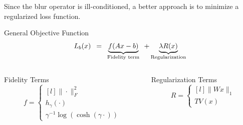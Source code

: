 \documentclass[12pt]{beamer}
\begin{document}
\begin{frame}
Since the blur operator is ill-conditioned, a better approach is to minimize a regularized loss function.
\begin{block}{General Objective Function}
\[ L_b(x) \hspace{0.5em} = \hspace{0.5em} \underbrace{f(Ax-b)}_{\text{Fidelity term}} \hspace{0.5em} + \underbrace{\lambda R(x)}_{\text{Regularization}} \]
\end{block}

\begin{columns}[T]
	\begin{column}{0.45\linewidth}
		\begin{block}{Fidelity Terms} \vspace{-2.5ex}
			\[ f = \left\{ \begin{matrix*}[l] 
			\| \cdot \|_F^2 \\[1ex] h_{\gamma}( \cdot ) \\[1ex] \gamma^{-1} \log(\cosh(\gamma \cdot)) 
			\end{matrix*} \right. \]
		\end{block}
	\end{column}
	\begin{column}{0.45\linewidth}
		\begin{block}{Regularization Terms}
			\[ R = \left\{ \begin{matrix*}[l]
			\| Wx \|_1 \\[1ex] TV(x)
			\end{matrix*} \right. \]
		\end{block}
	\end{column}
\end{columns}
\end{frame}
\end{document}
